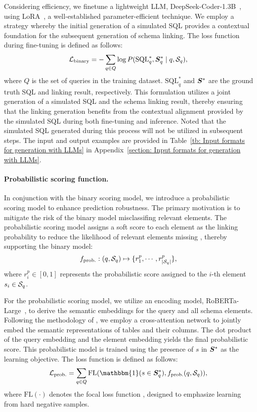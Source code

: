 Considering efficiency, we finetune a lightweight LLM, DeepSeek-Coder-1.3B~\citep{guo2024deepseek}, using LoRA~\citep{hu2021lora}, a well-established parameter-efficient technique. We employ a strategy whereby the initial generation of a simulated SQL provides a contextual foundation for the subsequent generation of schema linking. The loss function during fine-tuning is defined as follows:
\begin{equation}
\mathcal{L}_{\text{binary}} = - \sum_{q \in Q} \log P({\text{SQL}}^*_q, {\bm{S}}_q^* \mid q, {\mathcal{S}}_q),
\end{equation} where $Q$ is the set of queries in the training dataset. ${\text{SQL}}^*_q$ and ${\bm{S}}^*$ are the ground truth SQL and linking result, respectively. This formulation utilizes a joint generation of a simulated SQL and the schema linking result, thereby ensuring that the linking generation benefits from the contextual alignment provided by the simulated SQL during both fine-tuning and inference. Noted that the simulated SQL generated during this process will not be utilized in subsequent steps. The input and output examples are provided in Table~\ref{tb: Input formats for generation with LLMs} in Appendix~\ref{section: Input formats for generation with LLMs}.

\paragraph{Probabilistic scoring function.}
In conjunction with the binary scoring model, we introduce a probabilistic scoring model to enhance prediction robustness. The primary motivation is to mitigate the risk of the binary model misclassifing relevant elements. The probabilistic scoring model assigns a soft score to each element as the linking probability to reduce the likelihood of relevant elements missing , thereby supporting the binary model:
\begin{equation}
f_{\text{prob.}}: (q, {\mathcal{S}}_q) \mapsto \{r^p_1, \cdots, r^p_{|{\mathcal{S}}_q|}\},
\end{equation}
where  $r^p_i \in [0, 1]$ represents the probabilistic score assigned to the $i$-th element $s_i \in {\mathcal{S}}_q$.

For the probabilistic scoring model, we utilize an encoding model, RoBERTa-Large~\citep{liu2019roberta}, to derive the semantic embeddings for the query and all schema elements. Following the methodology of \citep{li2023resdsql,li2024codes}, we employ a cross-attention network to jointly embed the semantic representations of tables and their columns. The dot product of the query embedding and the element embedding yields the final probabilistic score. This probabilistic model is trained using the presence of $s$ in ${\bm{S}}^*$ as the learning objective. The loss function is defined as follows:
\begin{equation}\label{eq:training loss of recall model}
\mathcal{L}_{\text{prob.}} = \sum_{q \in Q} \text{FL}(\mathbbm{1}(s \in \mS^*_q), f_{\text{prob.}}(q,\gS_q)),
\end{equation}
where $\text{FL}(\cdot)$ denotes the focal loss function \citep{ross2017focal}, designed to emphasize learning from hard negative samples.

